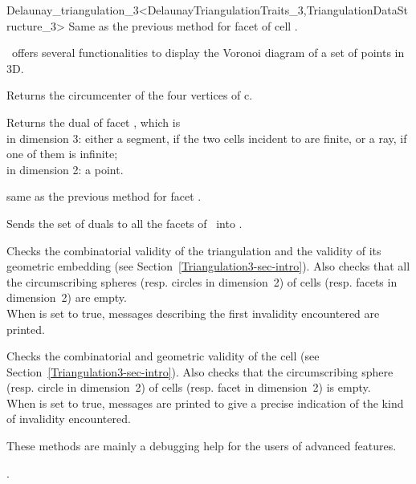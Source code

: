 \begin{ccRefClass}{Delaunay_triangulation_3<DelaunayTriangulationTraits_3,TriangulationDataStructure_3>}
{Same as the previous method for facet  of cell .}

\cgal\ offers several functionalities to display the Voronoi diagram of 
a set of points in 3D.

{Returns the circumcenter of the four vertices of c.
}

{Returns the dual of facet , which is \\
in dimension 3: either a segment, if the two cells incident to   
are finite, or a ray, if one of them is infinite;\\
in dimension 2: a point.
}

{same as the previous method for facet .}

{Sends the set of duals to all the facets of \ccVar\ into .}


\begin{ccAdvanced}
{Checks the combinatorial validity of the triangulation and the
validity of its geometric embedding (see
Section~\ref{Triangulation3-sec-intro}). Also checks that all the
circumscribing spheres (resp. circles in dimension~2) of  cells
(resp. facets in dimension~2) are empty.\\ When  is set to
true,  messages describing the first invalidity encountered are
printed.}

{Checks the combinatorial and geometric validity of the cell (see
Section~\ref{Triangulation3-sec-intro}). Also checks that the
circumscribing sphere (resp. circle in dimension~2) of  cells
(resp. facet in dimension~2) is empty.\\
 When  is set to
true, messages are printed to give
a precise indication of the kind of invalidity encountered.}

These methods are  mainly a debugging help for the users of advanced features.
\end{ccAdvanced}

\ccSeeAlso

.



\end{ccRefClass}


